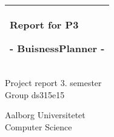 %
\begin{titlepage}
  \addtolength{\hoffset}{0.5\evensidemargin-0.5\oddsidemargin} %
  \noindent%
  \begin{tabular}{@{}p{\textwidth}@{}}
    \toprule[2pt]
    \midrule
    \vspace{0.2cm}
    \begin{center}
    \Huge{\textbf{
      Report for P3%
    }}
    \end{center}
    \begin{center}
      \Large{
        - BuisnessPlanner -%
      }
    \end{center}
    \vspace{0.2cm}\\
    \midrule
    \toprule[2pt]
  \end{tabular}
  \vspace{4 cm}
  \begin{center}
    {\large
      Project report 3. semester%
    }\\
    \vspace{0.2cm}
    {\Large
      Group ds315e15%
    }
  \end{center}
  \vfill
  \begin{center}
  Aalborg Universitetet\\
  Computer Science
  \end{center}
\end{titlepage}
\clearpage
